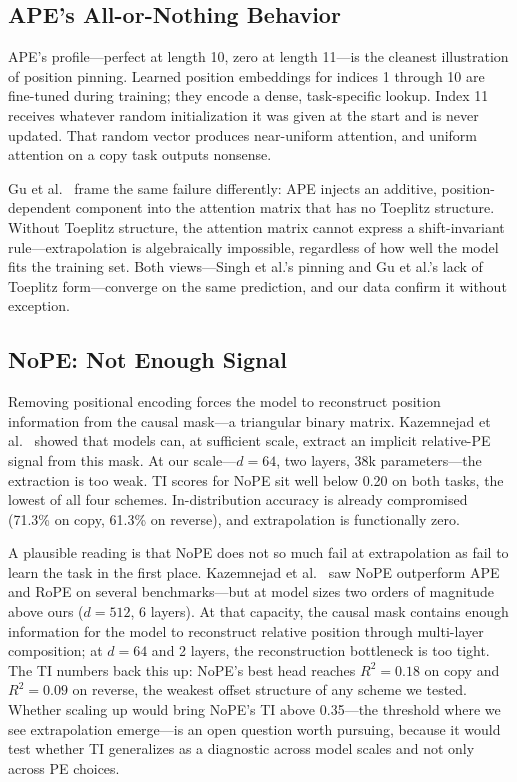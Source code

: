 \documentclass[10pt,twocolumn]{article}
\begin{document}
\subsection{APE's All-or-Nothing Behavior}

APE's profile---perfect at length 10, zero at length 11---is the cleanest illustration of position pinning.
Learned position embeddings for indices 1 through 10 are fine-tuned during training; they encode a dense, task-specific lookup.
Index 11 receives whatever random initialization it was given at the start and is never updated.
That random vector produces near-uniform attention, and uniform attention on a copy task outputs nonsense.

Gu et al.~\cite{gu2026deconstructing} frame the same failure differently: APE injects an additive, position-dependent component into the attention matrix that has no Toeplitz structure.
Without Toeplitz structure, the attention matrix cannot express a shift-invariant rule---extrapolation is algebraically impossible, regardless of how well the model fits the training set.
Both views---Singh et al.'s pinning and Gu et al.'s lack of Toeplitz form---converge on the same prediction, and our data confirm it without exception.

\subsection{NoPE: Not Enough Signal}

Removing positional encoding forces the model to reconstruct position information from the causal mask---a triangular binary matrix.
Kazemnejad et al.~\cite{kazemnejad2023impact} showed that models can, at sufficient scale, extract an implicit relative-PE signal from this mask.
At our scale---$d = 64$, two layers, 38k parameters---the extraction is too weak.
TI scores for NoPE sit well below 0.20 on both tasks, the lowest of all four schemes.
In-distribution accuracy is already compromised (71.3\% on copy, 61.3\% on reverse), and extrapolation is functionally zero.

A plausible reading is that NoPE does not so much fail at extrapolation as fail to learn the task in the first place.
Kazemnejad et al.~\cite{kazemnejad2023impact} saw NoPE outperform APE and RoPE on several benchmarks---but at model sizes two orders of magnitude above ours ($d = 512$, 6 layers).
At that capacity, the causal mask contains enough information for the model to reconstruct relative position through multi-layer composition; at $d = 64$ and 2 layers, the reconstruction bottleneck is too tight.
The TI numbers back this up: NoPE's best head reaches $R^2 = 0.18$ on copy and $R^2 = 0.09$ on reverse, the weakest offset structure of any scheme we tested.
Whether scaling up would bring NoPE's TI above 0.35---the threshold where we see extrapolation emerge---is an open question worth pursuing, because it would test whether TI generalizes as a diagnostic across model scales and not only across PE choices.
\end{document}

